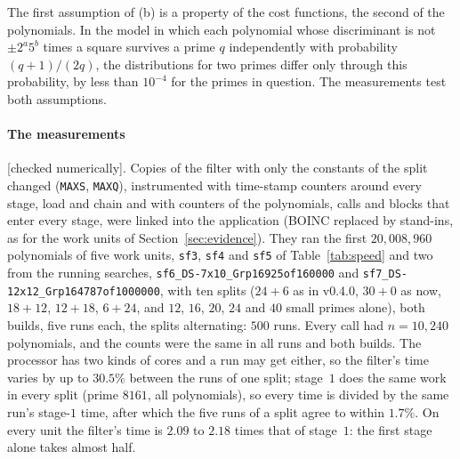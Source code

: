 \documentclass[10pt,a4paper]{article}
\newcommand{\code}[1]{\texttt{#1}}
\newcommand{\stnum}{\textsf{\small[checked numerically]}\xspace}
\theoremstyle{plain}
\theoremstyle{definition}
\begin{document}
The first assumption of (b) is a property of the cost functions, the second of the polynomials.  In the model in which each polynomial whose discriminant is not
$\pm2^a5^b$ times a square survives a prime $q$ independently with probability $(q+1)/(2q)$, the distributions for two primes differ only through this probability, by
less than $10^{-4}$ for the primes in question.  The measurements test both assumptions.

\paragraph{The measurements} \stnum.  Copies of the filter with only the constants of the split changed (\code{MAXS}, \code{MAXQ}), instrumented with time-stamp
counters around every stage, load and chain and with counters of the polynomials, calls and blocks that enter every stage, were linked into the application (BOINC
replaced by stand-ins, as for the work units of Section~\ref{sec:evidence}).  They ran the first $20{,}008{,}960$ polynomials of five work units, \code{sf3},
\code{sf4} and \code{sf5} of Table~\ref{tab:speed} and two from the running searches, \code{sf6\_DS-7x10\_Grp16925of160000} and
\code{sf7\_DS-12x12\_Grp164787of1000000}, with ten splits ($24+6$ as in v0.4.0, $30+0$ as now, $18+12$, $12+18$, $6+24$, and $12$, $16$, $20$, $24$ and $40$ small primes
alone), both builds, five runs each, the splits alternating: $500$ runs.  Every call had $n=10{,}240$ polynomials, and the counts were the same in all runs and both
builds.  The processor has two kinds of cores and a run may get either, so the filter's time varies by up to $30.5\%$ between the runs of one split; stage~$1$ does the
same work in every split (prime $8161$, all polynomials), so every time is divided by the same run's stage-$1$ time, after which the five runs of a split agree to
within $1.7\%$.  On every unit the filter's time is $2.09$ to $2.18$ times that of stage~$1$: the first stage alone takes almost half.
\end{document}
